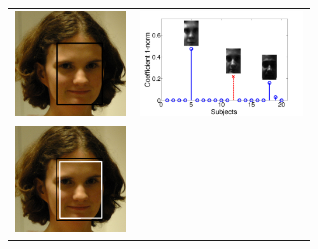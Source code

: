 \newcommand{\tempheight}[0]{1.1in}
\begin{figure}
\centering \begin{tabular}{cc}
\includegraphics[height=\tempheight]{figures_pami/promo/case1/detector.png}&
\hspace{3mm}
\includegraphics[height=\tempheight]{figures_pami/promo/case1/sci_with_axis_face_case1.png}
\\ \includegraphics[height=\tempheight]{figures_pami/promo/alignment_and_detector.png}&

\end{tabular}
\end{figure}
